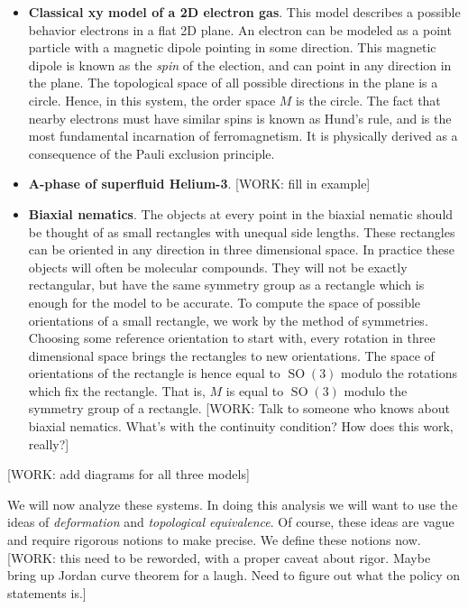 \documentclass{article}
\theoremstyle{definition}
\DeclareMathOperator{\SO}{SO}
\newcommand{\0}{\left|0\right>}
\newcommand{\1}{\left|1\right>}
\numberwithin{figure}{section}
\begin{document}
\begin{itemize}
\item \textbf{Classical xy model of a 2D electron gas}. This model describes a possible behavior electrons in a flat 2D plane. An electron can be modeled as a point particle with a magnetic dipole pointing in some direction. This magnetic dipole is known as the \textit{spin} of the election, and can point in any direction in the plane. The topological space of all possible directions in the plane is a circle. Hence, in this system, the order space $M$ is the circle. The fact that nearby electrons must have similar spins is known as Hund’s rule, and is the most fundamental incarnation of ferromagnetism. It is physically derived as a consequence of the Pauli exclusion principle.

\item \textbf{A-phase of superfluid Helium-3}.  [WORK: fill in example]

\item \textbf{Biaxial nematics}. The objects at every point in the biaxial nematic should be thought of as small rectangles with unequal side lengths. These rectangles can be oriented in any direction in three dimensional space. In practice these objects will often be molecular compounds. They will not be exactly rectangular, but have the same symmetry group as a rectangle which is enough for the model to be accurate. To compute the space of possible orientations of a small rectangle, we work by the method of symmetries. Choosing some reference orientation to start with, every rotation in three dimensional space brings the rectangles to new orientations. The space of orientations of the rectangle is hence equal to $\SO(3)$ modulo the rotations which fix the rectangle. That is, $M$ is equal to $\SO(3)$ modulo the symmetry group of a rectangle. [WORK: Talk to someone who knows about biaxial nematics. What's with the continuity condition? How does this work, really?]
\end{itemize}

[WORK: add diagrams for all three models]

We will now analyze these systems. In doing this analysis we will want to use the ideas of \textit{deformation} and \textit{topological equivalence}. Of course, these ideas are vague and require rigorous notions to make precise. We define these notions now. [WORK: this need to be reworded, with a proper caveat about rigor. Maybe bring up Jordan curve theorem for a laugh. Need to figure out what the policy on statements is.]
\end{document}
